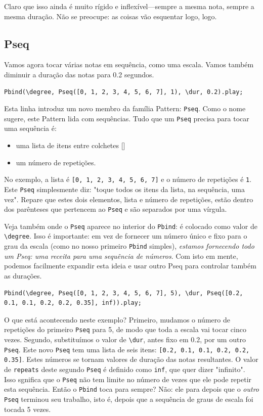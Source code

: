 Claro que isso ainda é muito rígido e inflexível---sempre a mesma nota, sempre a mesma duração. Não se preocupe: as coisas vão esquentar logo, logo.
\subsection{Pseq}

Vamos agora tocar várias notas em sequência, como uma escala. Vamos também diminuir a duração das notas para 0.2 segundos.
 
\begin{lstlisting}[style=SuperCollider-IDE, basicstyle=\scttfamily\footnotesize]
Pbind(\degree, Pseq([0, 1, 2, 3, 4, 5, 6, 7], 1), \dur, 0.2).play;
\end{lstlisting}

Esta linha introduz um novo membro da família Pattern: \texttt{Pseq}. Como o nome sugere, este Pattern lida com sequências. Tudo que um \texttt{Pseq} precisa para tocar uma sequência é:
\begin{itemize}
\item uma lista de itens entre colchetes []
\item um número de repetições.
\end{itemize} 

No exemplo, a lista é \texttt{[0, 1, 2, 3, 4, 5, 6, 7]} e o número de repetições é \texttt{1}. Este \texttt{Pseq} simplesmente diz: "toque todos os itens da lista, na sequência, uma vez". Repare que estes dois elementos, lista e número de repetições, estão dentro dos parênteses que pertencem ao \texttt{Pseq} e são separados por uma vírgula.

Veja também onde o \texttt{Pseq} aparece no interior do \texttt{Pbind}: é colocado como valor de \texttt{\textbackslash degree}. Isso é importante: em vez de fornecer um número único e fixo para o grau da escala (como no nosso primeiro \texttt{Pbind} simples), \emph{estamos fornecendo todo um Pseq: uma receita para uma sequência de números}. Com isto em mente, podemos facilmente expandir esta ideia e usar outro Pseq para controlar também as durações.
 
\begin{lstlisting}[style=SuperCollider-IDE, basicstyle=\scttfamily\footnotesize]
Pbind(\degree, Pseq([0, 1, 2, 3, 4, 5, 6, 7], 5), \dur, Pseq([0.2, 0.1, 0.1, 0.2, 0.2, 0.35], inf)).play;
\end{lstlisting}
 
O que está acontecendo neste exemplo? Primeiro, mudamos o número de repetições do primeiro \texttt{Pseq} para 5, de modo que toda a escala vai tocar cinco vezes. Segundo, substituímos o valor de \texttt{\textbackslash dur}, antes fixo em 0.2, por um outro \texttt{Pseq}. Este novo \texttt{Pseq} tem uma lista de seis itens: \texttt{[0.2, 0.1, 0.1, 0.2, 0.2, 0.35]}. Estes números se tornam valores de duração das notas resultantes. O valor de \texttt{repeats} deste segundo \texttt{Pseq} é definido como \texttt{inf}, que quer dizer "infinito". Isso sgnifica que o \texttt{Pseq} não tem limite no número de vezes que ele pode repetir esta sequência. Então o \texttt{Pbind} toca para sempre? Não: ele para depois que o \emph{outro} \texttt{Pseq} terminou seu trabalho, isto é, depois que a sequência de graus de escala foi tocada 5 vezes.

